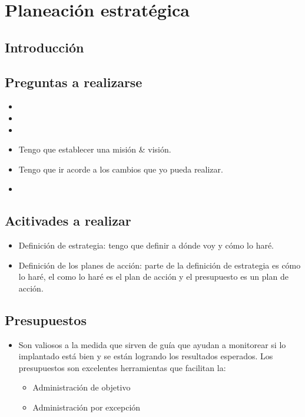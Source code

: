 \section{Planeación estratégica}
\subsection{Introducción}


\subsection{Preguntas a realizarse}
\begin{itemize}
    \item {} 
    \item {} 
    \item {} 
\end{itemize}
\begin{itemize}[label=\#]
    \item Tengo que establecer una misión \& visión.
    \item Tengo que ir acorde a los cambios que yo pueda realizar.
    \item {} 
\end{itemize}

\subsection{Acitivades a realizar}
\begin{itemize}
    \item Definición de estrategia: tengo que definir a dónde voy y cómo lo haré.
    \item Definición de los planes de acción: parte de la definición de estrategia es cómo lo haré, el como lo haré es el plan de acción y el presupuesto es un plan de acción.
\end{itemize}


\subsection{Presupuestos}
\begin{itemize}
    \item Son valiosos a la medida que sirven de guía que ayudan a monitorear si lo implantado está bien y se están logrando los resultados esperados. Los presupuestos son excelentes herramientas que facilitan la:
        \begin{itemize}
            \item Administración de objetivo 
            \item Administración por excepción
        \end{itemize}
\end{itemize}


